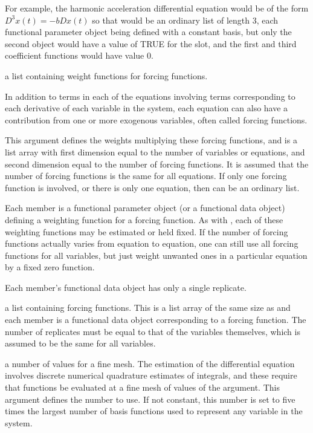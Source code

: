\begin{Arguments}
\begin{ldescription}
For example, the harmonic acceleration differential equation
would be of the form $D^3 x(t) = -b Dx(t)$ so that
would be an ordinary list of length 3, each functional parameter object
being defined with a constant basis, but only the second object would
have a value of TRUE for the  slot, and the first
and third coefficient functions would have value 0.

\item[\code{awtlist}] a list containing weight functions for forcing functions.

In addition to terms in each of the equations involving terms corresponding
to each derivative of each variable in the system, each equation can
also have a contribution from one or more exogenous variables, often
called forcing functions.

This argument defines the weights multiplying these
forcing functions, and is a list array with first dimension equal to
the number of variables or equations, and second dimension equal to the
number of forcing functions. It is assumed that the number of forcing functions is
the same for all equations. If only one forcing function is involved,
or there is only one equation, then  can be an
ordinary list.

Each member is a functional parameter object
(or a functional data object) defining a weighting function for a
forcing function.  As with
, each of these weighting functions may be estimated
or held fixed.  If the number of forcing functions actually varies from
equation to equation, one can still use all forcing functions for all
variables, but just weight unwanted ones in a particular equation by a
fixed zero function.

Each member's functional data object has only a single replicate.

\item[\code{ufdlist}] a list containing forcing functions.
This is a list array of the same size as  and each
member is a functional data object corresponding to a forcing function.
The number of replicates must be equal to that of the variables themselves,
which is assumed to be the same for all variables.

\item[\code{nfine}] a number of values for a fine mesh.
The estimation of the differential equation involves discrete
numerical quadrature estimates of integrals, and these require
that functions be evaluated at a fine mesh of values of the
argument.  This argument defines the number to use.  If not
constant, this number is set to five times the largest number of
basis functions used to represent any variable in the system.

\end{ldescription}
\end{Arguments}
